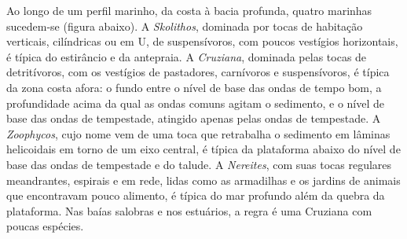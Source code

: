 Ao longo de um perfil marinho, da costa à bacia profunda, quatro  marinhas sucedem-se
(figura abaixo). A  \emph{Skolithos}, dominada por tocas de habitação verticais, cilíndricas ou
em U, de suspensívoros, com poucos vestígios horizontais, é típica do
estirâncio e da antepraia. A  \emph{Cruziana}, dominada pelas tocas de
detritívoros, com os vestígios de pastadores, carnívoros e suspensívoros, é típica da zona
costa afora: o fundo entre o nível de base das ondas de tempo bom, a profundidade acima da qual as ondas comuns agitam
o sedimento, e o nível de base das ondas de tempestade, atingido apenas pelas ondas de tempestade. A 
\emph{Zoophycos}, cujo nome vem de uma toca que retrabalha o sedimento em lâminas helicoidais em torno de um eixo
central, é típica da plataforma abaixo do nível de base das ondas de tempestade e do talude. A 
\emph{Nereites}, com suas tocas regulares meandrantes, espirais e em rede, lidas como as armadilhas e os
jardins de animais que encontravam pouco alimento, é típica do mar profundo além da quebra da plataforma. Nas
baías salobras e nos estuários, a regra é uma  Cruziana com poucas espécies.

